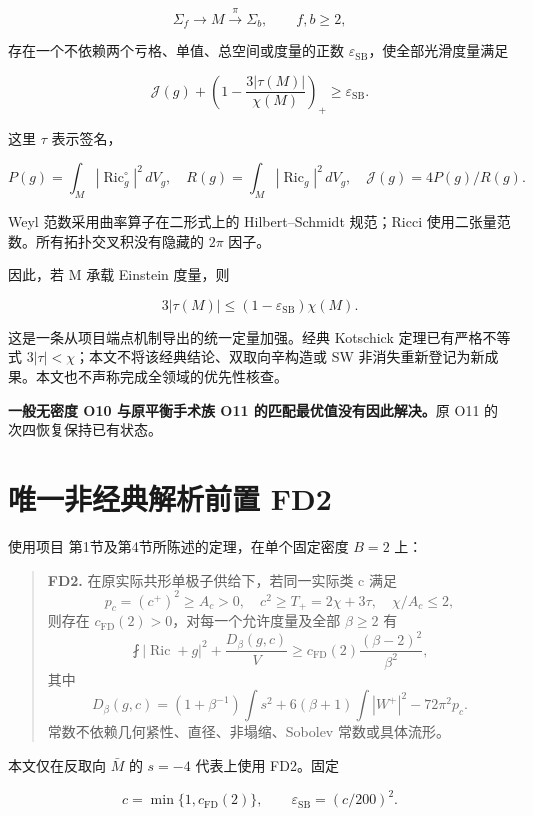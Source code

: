 \documentclass[UTF8,11pt,openany,fontset=none]{ctexbook}
\theoremstyle{definition}
\theoremstyle{remark}
\begin{document}
\[
\Sigma_f\longrightarrow M\stackrel\pi\longrightarrow\Sigma_b,
\qquad f,b\ge2,
\]

存在一个不依赖两个亏格、单值、总空间或度量的正数 \(\varepsilon_{\mathrm{SB}}\)，使全部光滑度量满足

\[
\boxed{\mathcal J(g)+\left(1-\frac{3|\tau(M)|}{\chi(M)}\right)_+
\ge\varepsilon_{\mathrm{SB}}.}
\tag{6.T}
\]

这里 \(\tau\) 表示签名，

\[
P(g)=\int_M|\operatorname{Ric}^{\circ}_g|^2\,dV_g,\quad
R(g)=\int_M|\operatorname{Ric}_g|^2\,dV_g,\quad
\mathcal J(g)=4P(g)/R(g).
\]

Weyl 范数采用曲率算子在二形式上的 Hilbert--Schmidt 规范；Ricci 使用二张量范数。所有拓扑交叉积没有隐藏的 \(2\pi\) 因子。

因此，若 M 承载 Einstein 度量，则

\[
\boxed{3|\tau(M)|\le(1-\varepsilon_{\mathrm{SB}})\chi(M).}
\tag{6.E}
\]

这是一条从项目端点机制导出的统一定量加强。经典 Kotschick 定理已有严格不等式 \(3|\tau|<\chi\)；本文不将该经典结论、双取向辛构造或 SW 非消失重新登记为新成果。本文也不声称完成全领域的优先性核查。

\textbf{一般无密度 O10 与原平衡手术族 O11 的匹配最优值没有因此解决。}原 O11 的次四恢复保持已有状态。

\section{唯一非经典解析前置 FD2}\label{v6-ux552fux4e00ux975eux7ecfux5178ux89e3ux6790ux524dux7f6e-fd2}

使用项目  第1节及第4节所陈述的定理，在单个固定密度 \(B=2\) 上：

\begin{quote}
\textbf{FD2.} 在原实际共形单极子供给下，若同一实际类 c 满足 \[
p_c=(c^+)^2\ge A_c>0,\quad c^2\ge T_+=2\chi+3\tau,
\quad\chi/A_c\le2,
\] 则存在 \(c_{\mathrm{FD}}(2)>0\)，对每一个允许度量及全部 \(\beta\ge2\) 有 \[
\fint|\operatorname{Ric}+g|^2+\frac{D_\beta(g,c)}V
\ge c_{\mathrm{FD}}(2)\frac{(\beta-2)^2}{\beta^2},
\] 其中 \[
D_\beta(g,c)=(1+\beta^{-1})\int s^2
+6(\beta+1)\int|W^+|^2-72\pi^2p_c.
\] 常数不依赖几何紧性、直径、非塌缩、Sobolev 常数或具体流形。
\end{quote}

本文仅在反取向 \(\bar M\) 的 \(s=-4\) 代表上使用 FD2。固定

\[
c=\min\{1,c_{\mathrm{FD}}(2)\},\qquad
\boxed{\varepsilon_{\mathrm{SB}}=(c/200)^2.}
\tag{6.1.1}
\]
\end{document}
